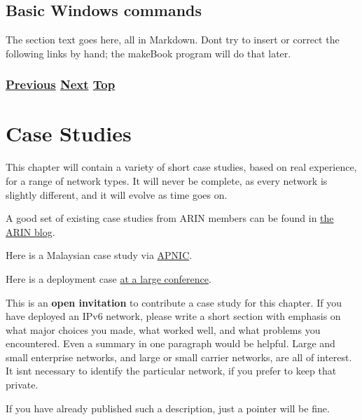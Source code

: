 \documentclass[
]{article}
\begin{document}
\pagebreak

\subsection{Basic Windows commands}\label{basic-windows-commands}

The section text goes here, all in Markdown. Don\textquotesingle t try
to insert or correct the following links by hand; the makeBook program
will do that later.

\subsubsection{\texorpdfstring{\hyperref[packet-size-and-jumbo-frames]{Previous}
\hyperref[case-studies]{Next}
\hyperref[management-and-operations]{Top}}{Previous Next Top}}\label{previous-next-top-34}

\pagebreak

\section{Case Studies}\label{case-studies}

This chapter will contain a variety of short case studies, based on real
experience, for a range of network types. It will never be complete, as
every network is slightly different, and it will evolve as time goes on.

A good set of existing case studies from ARIN members can be found in
\href{https://www.arin.net/blog/ipv6/}{the ARIN blog}.

Here is a Malaysian case study via
\href{https://blog.apnic.net/2023/03/17/telekom-malaysias-ipv6-readiness-journey/}{APNIC}.

Here is a deployment case
\href{https://nsrc.org/blog/apricot-ipv6-only}{at a large conference}.

This is an \textbf{open invitation} to contribute a case study for this
chapter. If you have deployed an IPv6 network, please write a short
section with emphasis on what major choices you made, what worked well,
and what problems you encountered. Even a summary in one paragraph would
be helpful. Large and small enterprise networks, and large or small
carrier networks, are all of interest. It isn\textquotesingle t
necessary to identify the particular network, if you prefer to keep that
private.

If you have already published such a description, just a pointer will be
fine.
\end{document}
